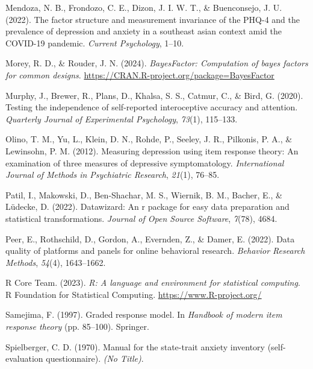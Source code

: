 \documentclass[
  jou,
  longtable,
  nolmodern,
  notxfonts,
  notimes,
  mask,
  colorlinks=true,linkcolor=blue,citecolor=blue,urlcolor=blue]{apa7}
\newlength{\cslhangindent}
\newenvironment{CSLReferences}[2] %
 {\begin{list}{}{%
  \setlength{\itemindent}{0pt}
  \setlength{\leftmargin}{0pt}
  \setlength{\parsep}{0pt}
  \ifodd #1
   \setlength{\leftmargin}{\cslhangindent}
   \setlength{\itemindent}{-1\cslhangindent}
  \fi
  \setlength{\itemsep}{#2\baselineskip}}}
 {\end{list}}
\begin{document}
\begin{CSLReferences}{1}{0}
Mendoza, N. B., Frondozo, C. E., Dizon, J. I. W. T., \& Buenconsejo, J.
U. (2022). The factor structure and measurement invariance of the PHQ-4
and the prevalence of depression and anxiety in a southeast asian
context amid the COVID-19 pandemic. \emph{Current Psychology}, 1--10.

Morey, R. D., \& Rouder, J. N. (2024). \emph{BayesFactor: Computation of
bayes factors for common designs}.
\url{https://CRAN.R-project.org/package=BayesFactor}

Murphy, J., Brewer, R., Plans, D., Khalsa, S. S., Catmur, C., \& Bird,
G. (2020). Testing the independence of self-reported interoceptive
accuracy and attention. \emph{Quarterly Journal of Experimental
Psychology}, \emph{73}(1), 115--133.

Olino, T. M., Yu, L., Klein, D. N., Rohde, P., Seeley, J. R., Pilkonis,
P. A., \& Lewinsohn, P. M. (2012). Measuring depression using item
response theory: An examination of three measures of depressive
symptomatology. \emph{International Journal of Methods in Psychiatric
Research}, \emph{21}(1), 76--85.

Patil, I., Makowski, D., Ben-Shachar, M. S., Wiernik, B. M., Bacher, E.,
\& Lüdecke, D. (2022). Datawizard: An r package for easy data
preparation and statistical transformations. \emph{Journal of Open
Source Software}, \emph{7}(78), 4684.

Peer, E., Rothschild, D., Gordon, A., Evernden, Z., \& Damer, E. (2022).
Data quality of platforms and panels for online behavioral research.
\emph{Behavior Research Methods}, \emph{54}(4), 1643--1662.

R Core Team. (2023). \emph{R: A language and environment for statistical
computing}. R Foundation for Statistical Computing.
\url{https://www.R-project.org/}

Samejima, F. (1997). Graded response model. In \emph{Handbook of modern
item response theory} (pp. 85--100). Springer.

Spielberger, C. D. (1970). Manual for the state-trait anxiety inventory
(self-evaluation questionnaire). \emph{(No Title)}.


\end{CSLReferences}
\end{document}
